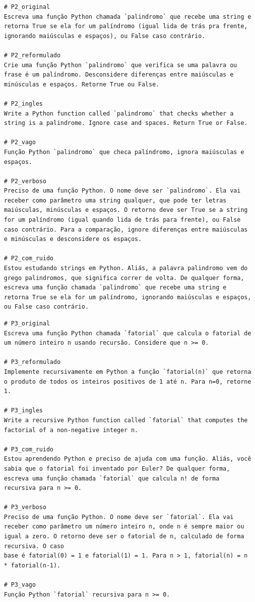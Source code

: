 \documentclass[12pt,
    english,
    french,
    spanish,
    brazil,
    ]{article}
\begin{document}
\begin{lstlisting}
# P2_original
Escreva uma função Python chamada `palindromo` que recebe uma string e retorna True se ela for um palíndromo (igual lida de trás pra frente, ignorando maiúsculas e espaços), ou False caso contrário.

# P2_reformulado
Crie uma função Python `palindromo` que verifica se uma palavra ou frase é um palíndromo. Desconsidere diferenças entre maiúsculas e minúsculas e espaços. Retorne True ou False.

# P2_ingles
Write a Python function called `palindromo` that checks whether a string is a palindrome. Ignore case and spaces. Return True or False.

# P2_vago
Função Python `palindromo` que checa palíndromo, ignora maiúsculas e espaços.

# P2_verboso
Preciso de uma função Python. O nome deve ser `palindromo`. Ela vai receber como parâmetro uma string qualquer, que pode ter letras maiúsculas, minúsculas e espaços. O retorno deve ser True se a string for um palíndromo (igual quando lida de trás para frente), ou False caso contrário. Para a comparação, ignore diferenças entre maiúsculas e minúsculas e desconsidere os espaços.

# P2_com_ruido
Estou estudando strings em Python. Aliás, a palavra palindromo vem do grego palindromos, que significa correr de volta. De qualquer forma, escreva uma função chamada `palindromo` que recebe uma string e retorna True se ela for um palíndromo, ignorando maiúsculas e espaços, ou False caso contrário.
\end{lstlisting}

\begin{lstlisting}
# P3_original
Escreva uma função Python chamada `fatorial` que calcula o fatorial de um número inteiro n usando recursão. Considere que n >= 0.

# P3_reformulado
Implemente recursivamente em Python a função `fatorial(n)` que retorna o produto de todos os inteiros positivos de 1 até n. Para n=0, retorne 1.

# P3_ingles
Write a recursive Python function called `fatorial` that computes the factorial of a non-negative integer n.

# P3_com_ruido
Estou aprendendo Python e preciso de ajuda com uma função. Aliás, você sabia que o fatorial foi inventado por Euler? De qualquer forma, escreva uma função chamada `fatorial` que calcula n! de forma recursiva para n >= 0.

# P3_verboso
Preciso de uma função Python. O nome deve ser `fatorial`. Ela vai receber como parâmetro um número inteiro n, onde n é sempre maior ou igual a zero. O retorno deve ser o fatorial de n, calculado de forma recursiva. O caso
base é fatorial(0) = 1 e fatorial(1) = 1. Para n > 1, fatorial(n) = n * fatorial(n-1).

# P3_vago
Função Python `fatorial` recursiva para n >= 0.
\end{lstlisting}
\end{document}

